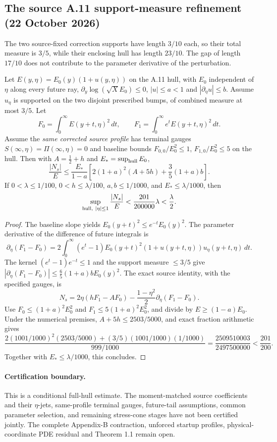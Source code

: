 \subsection*{The source A.11 support-measure refinement (22 October 2026)}
\label{subsec:a11-support-measure-refinement}
The two source-fixed correction supports have length $3/10$ each,
so their total measure is $3/5$, while their enclosing hull has
length $23/10$. The gap of length $17/10$ does not contribute
to the parameter derivative of the perturbation.

\begin{proposition}
\label{prop:a11-support-measure-refinement}
Let $E(y,\eta)=E_0(y)(1+u(y,\eta))$ on the A.11 hull,
with $E_0$ independent of $\eta$ along every future ray,
$\partial_y\log(\sqrt X E_0)\le0$, $|u|\le a<1$ and
$|\partial_\eta u|\le b$. Assume $u_\eta$ is supported on
the two disjoint prescribed bumps, of combined measure
at most $3/5$. Let
\[
 F_0=\int_0^\infty E(y+t,\eta)^2\,dt,\qquad
 F_1=\int_0^\infty e^t E(y+t,\eta)^2\,dt.
\]
Assume the \emph{same corrected source profile} has terminal
gauges $S(\infty,\eta)=\Pi(\infty,\eta)=0$ and baseline bounds
$F_{0,0}/E_0^2\le1$, $F_{1,0}/E_0^2\le5$ on the hull.
Then with $A=\frac12+h$ and $E_*=\sup_{\rm hull}E_0$,
\[
 \frac{|N_s|}{E}\le\frac{E_*}{1-a}
 \left[2(1+a)^2(A+5h)+\frac35(1+a)b\right].
\]
If $0<\lambda\le1/100$, $0<h\le\lambda/100$,
$a,b\le1/1000$, and $E_*\le\lambda/1000$, then
\[
 \sup_{\rm hull,\ |\eta|\le1}\frac{|N_s|}{E}
 <\frac{201}{200000}\lambda<\frac\lambda2.
\]
\end{proposition}
\begin{proof}
The baseline slope yields $E_0(y+t)^2\le e^{-t}E_0(y)^2$.
The parameter derivative of the difference of future integrals is
\[
 \partial_\eta(F_1-F_0)=2\int_0^\infty(e^t-1)
 E_0(y+t)^2(1+u(y+t,\eta))u_\eta(y+t,\eta)\,dt.
\]
The kernel $(e^t-1)e^{-t}\le1$ and the support measure
$\le3/5$ give
$|\partial_\eta(F_1-F_0)|\le
\frac65(1+a)bE_0(y)^2$.
The exact source identity, with the specified gauges, is
\[
 N_s=2\eta(hF_1-AF_0)
 -\frac{1-\eta^2}{2}\partial_\eta(F_1-F_0).
\]
Use $F_0\le(1+a)^2E_0^2$ and
$F_1\le5(1+a)^2E_0^2$, and divide by
$E\ge(1-a)E_0$. Under the numerical premises,
$A+5h\le2503/5000$, and exact fraction arithmetic gives
\[
 \frac{2(1001/1000)^2(2503/5000)
 +(3/5)(1001/1000)(1/1000)}{999/1000}
 =\frac{2509510003}{2497500000}<\frac{201}{200}.
\]
Together with $E_*\le\lambda/1000$, this concludes.
\end{proof}

\paragraph{Certification boundary.}
This is a conditional full-hull estimate. The moment-matched
source coefficients and their $\eta$-jets, same-profile terminal
gauges, future-tail assumptions, common parameter selection, and
remaining stress-cone stages have not been certified jointly.
The complete Appendix-B contraction, unforced startup profiles,
physical-coordinate PDE residual and Theorem 1.1 remain open.
